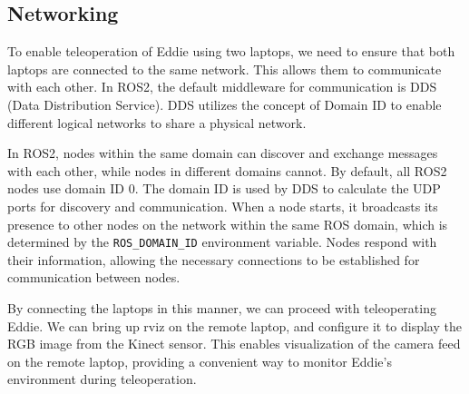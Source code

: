 \subsection{Networking}
To enable teleoperation of Eddie using two laptops, we need to ensure that both laptops are connected to the same network. This allows them to communicate with each other. In ROS2, the default middleware for communication is DDS (Data Distribution Service). DDS utilizes the concept of Domain ID to enable different logical networks to share a physical network.

In ROS2, nodes within the same domain can discover and exchange messages with each other, while nodes in different domains cannot. By default, all ROS2 nodes use domain ID 0. The domain ID is used by DDS to calculate the UDP ports for discovery and communication. When a node starts, it broadcasts its presence to other nodes on the network within the same ROS domain, which is determined by the \textcolor{BrickRed}{\texttt{ROS\_DOMAIN\_ID}} environment variable. Nodes respond with their information, allowing the necessary connections to be established for communication between nodes.

By connecting the laptops in this manner, we can proceed with teleoperating Eddie. We can bring up rviz on the remote laptop, and configure it to display the RGB image from the Kinect sensor. This enables visualization of the camera feed on the remote laptop, providing a convenient way to monitor Eddie's environment during teleoperation.

